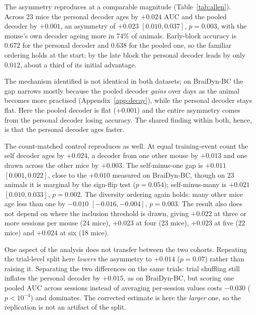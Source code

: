 \documentclass{article}
\newcommand{\auc}{\mathrm{AUC}}
\begin{document}
The asymmetry reproduces at a comparable magnitude (Table~\ref{tab:allen}). Across 23 mice the
personal decoder ages by $+0.024$ $\auc$ and the pooled decoder by $+0.001$, an asymmetry of
$+0.023$ $[0.010, 0.037]$, $p = 0.003$, with the mouse's own decoder ageing more in 74\% of animals.
Early-block accuracy is $0.672$ for the personal decoder and $0.638$ for the pooled one, so the
familiar ordering holds at the start; by the late block the personal decoder leads by only $0.012$,
about a third of its initial advantage.

The mechanism identified is not identical in both datasets; on BraiDyn-BC the gap narrows
mostly because the pooled decoder \emph{gains} over days as the animal becomes more practised
(Appendix~\ref{app:decay}), while the personal decoder stays flat. Here the pooled decoder is flat
($+0.001$) and the entire asymmetry comes from the personal decoder losing accuracy. The shared
finding within both, hence, is that the personal decoder ages faster.

The count-matched control reproduces as well. At equal training-event count the self decoder ages
by $+0.024$, a decoder from one other mouse by $+0.013$ and one drawn across the other mice by
$+0.003$. The self-minus-one gap is $+0.011$ $[0.001, 0.022]$, close to the $+0.010$ measured on
BraiDyn-BC, though on 23 animals it is marginal by the sign-flip test ($p = 0.054$); self-minus-many
is $+0.021$ $[0.010, 0.033]$, $p = 0.002$. The diversity ordering again holds: many other mice age
less than one by $-0.010$ $[-0.016, -0.004]$, $p = 0.003$.
The result also does not depend on where the inclusion threshold is drawn, giving $+0.022$ at three
or more sessions per mouse (24 mice), $+0.023$ at four (23 mice), $+0.023$ at five (22 mice) and
$+0.024$ at six (18 mice).

One aspect of the analysis does not transfer between the two cohorts. Repeating the trial-level
split here \emph{lowers} the asymmetry to
$+0.014$ ($p = 0.07$) rather than raising it. Separating the two differences on the same trials:
trial shuffling still inflates the personal decoder by $+0.015$, as on BraiDyn-BC, but scoring one
pooled $\auc$ across sessions instead of averaging per-session values costs $-0.030$
($p < 10^{-4}$) and dominates. The corrected estimate is here the \emph{larger} one, so the
replication is not an artifact of the split.
\end{document}
